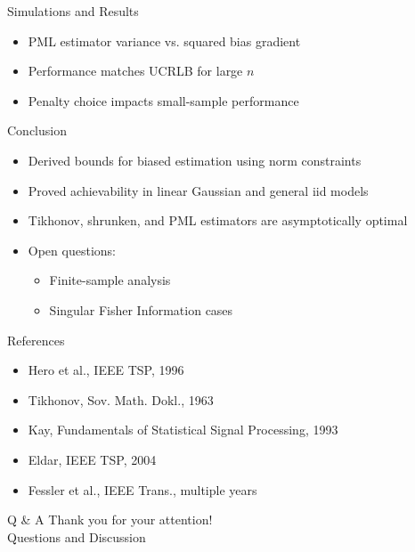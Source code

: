 \documentclass{beamer}
\begin{document}
\begin{frame}{Simulations and Results}
  \begin{itemize}
    \item PML estimator variance vs. squared bias gradient
    \item Performance matches UCRLB for large $n$
    \item Penalty choice impacts small-sample performance
  \end{itemize}
\end{frame}

\begin{frame}{Conclusion}
  \begin{itemize}
    \item Derived bounds for biased estimation using norm constraints
    \item Proved achievability in linear Gaussian and general iid models
    \item Tikhonov, shrunken, and PML estimators are asymptotically optimal
    \item Open questions:
    \begin{itemize}
      \item Finite-sample analysis
      \item Singular Fisher Information cases
    \end{itemize}
  \end{itemize}
\end{frame}

\begin{frame}{References}
  \scriptsize
  \begin{itemize}
    \item Hero et al., IEEE TSP, 1996
    \item Tikhonov, Sov. Math. Dokl., 1963
    \item Kay, Fundamentals of Statistical Signal Processing, 1993
    \item Eldar, IEEE TSP, 2004
    \item Fessler et al., IEEE Trans., multiple years
  \end{itemize}
\end{frame}

\begin{frame}{Q \& A}
  \centering
  Thank you for your attention! \\
  Questions and Discussion
\end{frame}
\end{document}

